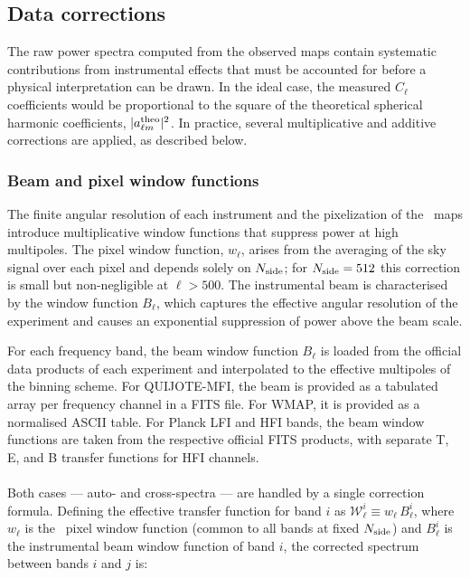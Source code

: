 \subsection{Data corrections}
\label{sec:corrections}

The raw power spectra computed from the observed maps contain systematic contributions from instrumental effects that must be accounted for before a physical interpretation can be drawn. In the ideal case, the measured $C_\ell$ coefficients would be proportional to the square of the theoretical spherical harmonic coefficients, $|a_{\ell m}^{\rm theo}|^2$. In practice, several multiplicative and additive corrections are applied, as described below.

\subsubsection{Beam and pixel window functions}
\label{sec:beam_correction}

The finite angular resolution of each instrument and the pixelization of the \healpix\ maps \citep{Gorski_2005} introduce multiplicative window functions that suppress power at high multipoles. The pixel window function, $w_\ell$, arises from the averaging of the sky signal over each pixel and depends solely on $N_{\rm side}$; for $N_{\rm side} = 512$ this correction is small but non-negligible at $\ell > 500$. The instrumental beam is characterised by the window function $B_\ell$, which captures the effective angular resolution of the experiment and causes an exponential suppression of power above the beam scale.

For each frequency band, the beam window function $B_\ell$ is loaded from the official data products of each experiment and interpolated to the effective multipoles of the binning scheme. For QUIJOTE-MFI, the beam is provided as a tabulated array per frequency channel in a FITS file. For WMAP, it is provided as a normalised ASCII table. For Planck LFI and HFI bands, the beam window functions are taken from the respective official FITS products, with separate T, E, and B transfer functions for HFI channels.

\paragraph{}

Both cases — auto- and cross-spectra — are handled by a single correction formula. Defining the effective transfer function for band $i$ as $\mathcal{W}_\ell^i \equiv w_\ell\, B_\ell^i$, where $w_\ell$ is the \healpix\ pixel window function (common to all bands at fixed $N_{\rm side}$) and $B_\ell^i$ is the instrumental beam window function of band $i$, the corrected spectrum between bands $i$ and $j$ is:

